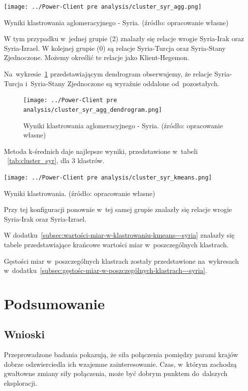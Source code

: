 \documentclass[11pt]{report}
\begin{document}
    \begin{table}[tp]
        \centering
        \texttt{[image: ../Power-Client pre analysis/cluster\_syr\_agg.png]}
        \caption{Wyniki klastrowania aglomeracyjnego - Syria. (źródło: opracowanie własne)}
        \label{tab:cluster_syr_agg}
    \end{table}

    W tym przypadku w~jednej grupie (2) znalazły się relacje wrogie Syria-Irak oraz Syria-Izrael.
    W kolejnej grupie (0) są relacje Syria-Turcja oraz Syria-Stany Zjednoczone.
    Możemy określić te relacje jako Klient-Hegemon.


    Na~wykresie~\ref{fig:cluster_syr_agg_dendrogram} przedstawiającym dendrogram obserwujemy, że relacje
    Syria-Turcja i~Syria-Stany Zjednoczone są wyraźnie oddalone od~pozostałych.

    \begin{figure}[tp]
        \centering
        \texttt{[image: ../Power-Client pre analysis/cluster\_syr\_agg\_dendrogram.png]}
        \caption{Wyniki klastrowania aglomeracyjnego - Syria. (źródło: opracowanie własne)}
        \label{fig:cluster_syr_agg_dendrogram}
    \end{figure}

    Metoda k-średnich daje najlepsze wyniki, przedstawione w~tabeli ~\ref{tab:cluster_syr}, dla 3 klastrów.

    \begin{table}[tp]
        \centering
        \texttt{[image: ../Power-Client pre analysis/cluster\_syr\_kmeans.png]}
        \caption{Wyniki klastrowania. (źródło: opracowanie własne)}
        \label{tab:cluster_syr}
    \end{table}

    Przy tej konfiguracji ponownie w~tej samej grupie znalazły się relacje wrogie Syria-Irak oraz Syria-Izrael.

    W dodatku~\ref{subsec:wartości-miar-w-klastrowaniu-kmeans---syria} znalazły się tabele przedstawiające krańcowe wartości miar w~poszczególnych klastrach.

    Gęstości miar w~poszczególnych klastrach zostały przedstawione na~wykresach w~dodatku~\ref{subsec:gęstośc-miar-w-poszczególnych-klastrach---syria}.


    \chapter{Podsumowanie}\label{ch:podsumowanie}


    \section{Wnioski}\label{sec:wnioski}
    Przeprowadzone badania pokazują, że siła połączenia pomiędzy parami krajów dobrze odzwierciedla ich wzajemne zainteresowanie.
    Czas, w~którym zachodzą gwałtowne zmiany siły połączenia, może być dobrym punktem do~dalszych eksploracji.
\end{document}
